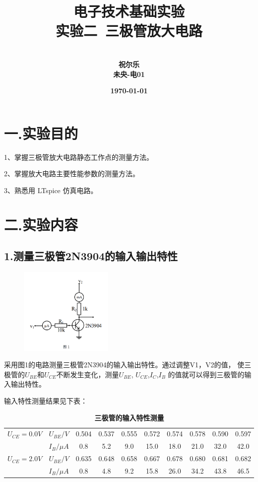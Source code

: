 \documentclass[UTF8]{ctexart}
\title{{电子技术基础实验} \\ \textbf{实验二\ 三极管放大电路}}
\author{\\\textbf{祝尔乐}
        \\\textbf{未央-电01}
        }
\date{\textbf{\today}}
\begin{document}
\maketitle

\section*{一.实验目的}
1、掌握三极管放大电路静态工作点的测量方法。

2、掌握放大电路主要性能参数的测量方法。

3、熟悉用 LTspice 仿真电路。

\section*{二.实验内容}

\subsection*{1.测量三极管2N3904的输入输出特性}
\begin{figure}[htbp]
   \centering
   \includegraphics[width=0.40\textwidth]{1-电路图.png}
\end{figure}

采用图1的电路测量三极管2N3904的输入输出特性。通过调整V1，V2的值，
使三极管的$U_{BE}$和$U_{CE}$不断发生变化，测量$U_{BE}$, $U_{CE}$,$I_C$,$I_B$
的值就可以得到三极管的输入输出特性。

输入特性测量结果见下表：

\begin{table}[H]
        \centering
        \caption{\label{表1}\textbf{三极管的输入特性测量}}
        \begin{tabular}{cccccccccc}
        \toprule
        $U_{CE} = 0.0V$ & $U_{BE}/V$      & 0.504 & 0.537 & 0.555 & 0.572 & 0.574 & 0.578 & 0.590 & 0.597 \\
                        & $I_{B}/\mu A$   & 0.8   & 5.2   & 9.0   & 15.0  & 18.0  & 21.0  & 32.0  & 42.0 \\
        \midrule
        $U_{CE} = 2.0V$ &$U_{BE}/V$      & 0.635 & 0.648 & 0.658 & 0.667 & 0.678 & 0.680 & 0.681 & 0.682  \\
                        &$I_{B}/\mu A$   & 0.8   & 4.8   & 9.2   & 15.8  & 26.0  & 34.2  & 43.8  & 46.5   \\
        \bottomrule
        \end{tabular}
\end{table}
\end{document}
